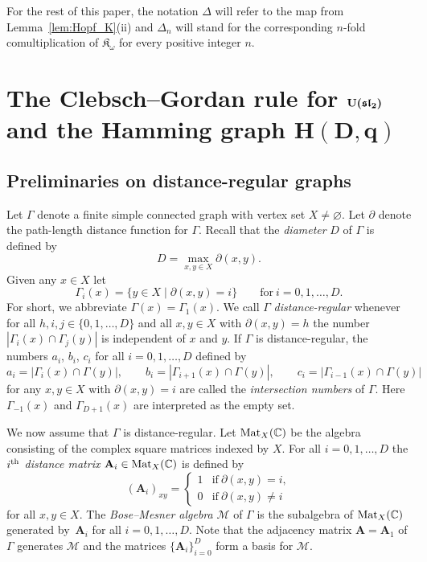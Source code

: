 \documentclass[10pt,a4paper]{amsart}
\def\A{\mathbf A}
\def\C{\mathbb C}
\def\K{\mathfrak K_\omega}
\def\Mat{{\rm Mat}}
\def\M{\mathcal M}
\def\U{{\rm U}(\mathfrak{sl}_2)}
\numberwithin{equation}{section}
\begin{document}
For the rest of this paper, the notation $\Delta$ will refer to the map from Lemma~\ref{lem:Hopf_K}(ii) and $\Delta_n$ will stand for the corresponding $n$-fold comultiplication of $\K$ for every positive integer $n$.

\section[The Clebsch--Gordan rule for U(sl\_2) and the Hamming graph H(D,q)]{The Clebsch--Gordan rule for $\boldsymbol{\U}$\\ and the Hamming graph $\boldsymbol{H(D,q)}$}\label{s:Hamming}

\subsection{Preliminaries on distance-regular graphs}%

Let $\Gamma$ denote a finite simple connected graph with vertex set $X\not=\varnothing$. Let $\partial$ denote the path-length distance function for $\Gamma$. Recall that the {\it diameter} $D$ of $\Gamma$ is defined by
\[
D=\max_{x,y\in X}\partial(x,y).
\]
Given any $x\in X$ let
\[
\Gamma_i(x)=\{y\in X\mid \partial(x,y)=i\}\qquad
\text{for}\ i=0,1,\dots,D.
\]
For short, we abbreviate $\Gamma(x)=\Gamma_1(x)$. We call $\Gamma$ {\it distance-regular} whenever for all $h,i,j\in\{0,1,\dots,D\}$ and all $x,y\in X$ with $\partial(x,y)=h$ the number
$|\Gamma_i(x)\cap \Gamma_j(y)|$
is independent of $x$ and $y$. If $\Gamma$ is distance-regular, the numbers $a_i$, $b_i$, $c_i$ for all $i=0,1,\dots,D$ defined by
\[
a_i = |\Gamma_i(x) \cap \Gamma(y)|,\qquad
b_i = |\Gamma_{i+1}(x) \cap \Gamma(y)|,\qquad
c_i = |\Gamma_{i-1}(x) \cap \Gamma(y)|
\]
for any $x,y\in X$ with $\partial(x,y)=i$ are called the {\it intersection numbers} of $\Gamma$. Here $\Gamma_{-1}(x)$ and $\Gamma_{D+1}(x)$ are interpreted as the empty set.

We now assume that $\Gamma$ is distance-regular.
Let $\Mat_X(\C)$ be the algebra consisting of the complex square matrices indexed by $X$.
For all $i=0,1,\dots,D$ the {\it $i^{\rm th}$ distance matrix} $\A_i\in \Mat_X(\C)$ is defined by
\[
(\A_i)_{xy}
=
\begin{cases}
1
&\text{if}\ \partial(x,y)=i,
\\
0
&\text{if}\ \partial(x,y)\not=i
\end{cases}
\]
for all $x,y\in X$. The {\it Bose--Mesner algebra} $\M$ of $\Gamma$ is the subalgebra of $\Mat_X(\C)$ generated by~$\A_i$ for all $i=0,1,\dots,D$. Note that the adjacency matrix $\A=\A_1$ of $\Gamma$ generates $\M$ and the matrices $\{\A_i\}_{i=0}^D$ form a basis for $\M$.
\end{document}

